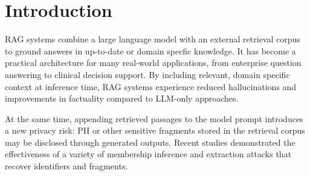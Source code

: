 
\chapter{Introduction}\label{chapter:introduction}








\ac{RAG} systems combine a large language model with an external retrieval corpus to ground answers in up-to-date or domain specfic knowledge. It has become a practical architecture for many real-world applications, from enterprise question answering to clinical decision support. \cite{chatDoctor} By including relevant, domain specific context at inference time, RAG systems experience reduced hallucinations \cite{ragNoHallucination} and improvements in factuality compared to LLM-only approaches. \cite{ragOrigin}

At  the same time, appending retrieved passages to the model prompt introduces a new privacy risk: \ac{PII} or other sensitive fragments stored in the retrieval corpus may be disclosed through generated outputs. Recent studies demonstrated the effectiveness of a variety of membership inference and extraction attacks that recover identifiers and fragments. \cite{goodAndBad,ragThief,ragMIA,generatingIsBelieving,DEAL}

